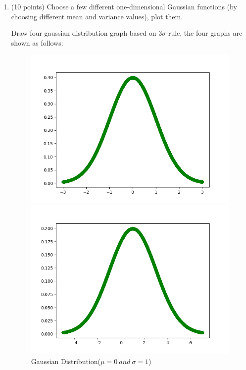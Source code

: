 \documentclass[10pt]{article}
\begin{document}
\begin{enumerate}[label=2.\arabic*]
    \item (10 points)
    Choose a few different one-dimensional Gaussian functions (by choosing different mean and variance values), plot them.\par
    Draw four gaussian distribution graph based on 3$\sigma$-rule, the four graphs are shown as follows:\par
    \begin{figure}[htbp]
    	\centering
    	\begin{minipage}[c]{0.5\textwidth} %
    		\centering
    		\includegraphics[width=1\linewidth]{./gaussian/0.png}
    		\caption{Gaussian Distribution($\mu=0\ and\ \sigma=1$)}
    	\end{minipage}%
    	\begin{minipage}[c]{0.5\textwidth}
    		\centering
    		\includegraphics[width=1\textwidth]{./gaussian/1.png}

\end{minipage}
\end{figure}
\end{enumerate}
\end{document}
